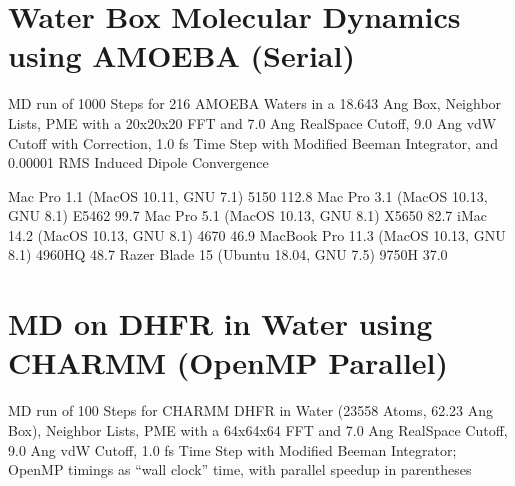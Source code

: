 \documentclass[letterpaper,11pt,english]{sphinxmanual}
\begin{document}
\section{Water Box Molecular Dynamics using AMOEBA (Serial)}
\label{\detokenize{text/benchmarks:water-box-molecular-dynamics-using-amoeba-serial}}
MD run of 1000 Steps for 216 AMOEBA Waters in a 18.643 Ang Box, Neighbor Lists, PME with a 20x20x20 FFT and 7.0 Ang Real\sphinxhyphen{}Space Cutoff, 9.0 Ang vdW Cutoff with Correction, 1.0 fs Time Step with Modified Beeman Integrator, and 0.00001 RMS Induced Dipole Convergence


\begin{sphinxVerbatim}[commandchars=\\\{\}]
Mac Pro 1.1 (MacOS 10.11, GNU 7.1)             5150               112.8
Mac Pro 3.1 (MacOS 10.13, GNU 8.1)            E5462                99.7
Mac Pro 5.1 (MacOS 10.13, GNU 8.1)            X5650                82.7
iMac 14.2 (MacOS 10.13, GNU 8.1)               4670                46.9
MacBook Pro 11.3 (MacOS 10.13, GNU 8.1)      4960HQ                48.7
Razer Blade 15 (Ubuntu 18.04, GNU 7.5)        9750H                37.0
\end{sphinxVerbatim}


\section{MD on DHFR in Water using CHARMM (OpenMP Parallel)}
\label{\detokenize{text/benchmarks:md-on-dhfr-in-water-using-charmm-openmp-parallel}}
MD run of 100 Steps for CHARMM DHFR in Water (23558 Atoms, 62.23 Ang Box), Neighbor Lists, PME with a 64x64x64 FFT and 7.0 Ang Real\sphinxhyphen{}Space Cutoff, 9.0 Ang vdW Cutoff, 1.0 fs Time Step with Modified Beeman Integrator; OpenMP timings as “wall clock” time, with parallel speedup in parentheses

\end{document}
